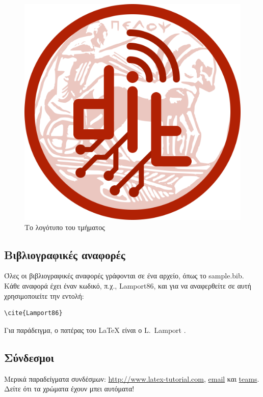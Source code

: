 \documentclass[a4paper,11pt]{article}
\begin{document}
\begin{figure}
\centering
\includegraphics[scale=.2]{dit-uop-logo-regular-red}
\caption{Το λογότυπο του τμήματος}
\label{fig:dit}
\end{figure}


%
%
\subsection{Βιβλιογραφικές αναφορές}\label{sec:cite}
Όλες οι βιβλιογραφικές αναφορές γράφονται σε ένα  αρχείο, όπως το sample.bib. Κάθε αναφορά έχει έναν κωδικό, π.χ., Lamport86, και για να αναφερθείτε σε αυτή χρησιμοποιείτε την εντολή:
\begin{verbatim}
\cite{Lamport86}
\end{verbatim}
Για παράδειγμα, ο πατέρας του {\LaTeX} είναι ο L.\ Lamport \cite{Lamport86}.

%
%
\subsection{Σύνδεσμοι}
Μερικά παραδείγματα συνδέσμων: \url{http://www.latex-tutorial.com}, \href{mailto:sss@uop.gr}{email} και \href{https://teams.microsoft.com/}{teams}. Δείτε ότι τα χρώματα έχουν μπει αυτόματα! 


\end{document}
